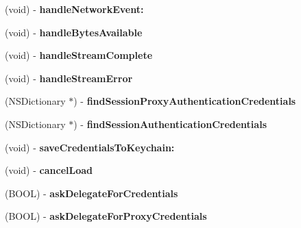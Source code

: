 \begin{DoxyCompactItemize}
\item 
\hypertarget{interface_a_s_i_h_t_t_p_request_a271ec6e669cafa5063866022fb3577ba}{
(void) -\/ {\bfseries handleNetworkEvent:}}
\label{interface_a_s_i_h_t_t_p_request_a271ec6e669cafa5063866022fb3577ba}

\item 
\hypertarget{interface_a_s_i_h_t_t_p_request_aefae44a699dc9e70b78930322cfb3558}{
(void) -\/ {\bfseries handleBytesAvailable}}
\label{interface_a_s_i_h_t_t_p_request_aefae44a699dc9e70b78930322cfb3558}

\item 
\hypertarget{interface_a_s_i_h_t_t_p_request_aaf27f7d11cd1194d5087db56cc553d89}{
(void) -\/ {\bfseries handleStreamComplete}}
\label{interface_a_s_i_h_t_t_p_request_aaf27f7d11cd1194d5087db56cc553d89}

\item 
\hypertarget{interface_a_s_i_h_t_t_p_request_ab792c755bbcec55490688d2b5aa729ec}{
(void) -\/ {\bfseries handleStreamError}}
\label{interface_a_s_i_h_t_t_p_request_ab792c755bbcec55490688d2b5aa729ec}

\item 
\hypertarget{interface_a_s_i_h_t_t_p_request_a480d62ba0d9ba8d1a64b25b45fb2d965}{
(NSDictionary $\ast$) -\/ {\bfseries findSessionProxyAuthenticationCredentials}}
\label{interface_a_s_i_h_t_t_p_request_a480d62ba0d9ba8d1a64b25b45fb2d965}

\item 
\hypertarget{interface_a_s_i_h_t_t_p_request_a0f38ffc0ae199e83262895f640c9c263}{
(NSDictionary $\ast$) -\/ {\bfseries findSessionAuthenticationCredentials}}
\label{interface_a_s_i_h_t_t_p_request_a0f38ffc0ae199e83262895f640c9c263}

\item 
\hypertarget{interface_a_s_i_h_t_t_p_request_a3a57684f5aba49781ec3c9c9ef1516a6}{
(void) -\/ {\bfseries saveCredentialsToKeychain:}}
\label{interface_a_s_i_h_t_t_p_request_a3a57684f5aba49781ec3c9c9ef1516a6}

\item 
\hypertarget{interface_a_s_i_h_t_t_p_request_ad64a88ff354a1e9acd0e50f6bd6383af}{
(void) -\/ {\bfseries cancelLoad}}
\label{interface_a_s_i_h_t_t_p_request_ad64a88ff354a1e9acd0e50f6bd6383af}

\item 
\hypertarget{interface_a_s_i_h_t_t_p_request_a80a8049a97291996c5b32c8048ced862}{
(BOOL) -\/ {\bfseries askDelegateForCredentials}}
\label{interface_a_s_i_h_t_t_p_request_a80a8049a97291996c5b32c8048ced862}

\item 
\hypertarget{interface_a_s_i_h_t_t_p_request_a914ee841472efc3e9124452df94d6f3a}{
(BOOL) -\/ {\bfseries askDelegateForProxyCredentials}}
\label{interface_a_s_i_h_t_t_p_request_a914ee841472efc3e9124452df94d6f3a}

\end{DoxyCompactItemize}
